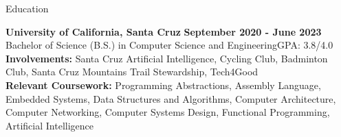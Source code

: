 \documentclass{resume}
\begin{document}
\begin{rSection}{\large Education}

{\bf University of California, Santa Cruz} \hfill {\bf{September 2020 - June 2023}}
\\ Bachelor of Science (B.S.) in Computer Science and Engineering\hfill {GPA: 3.8/4.0}
\\ \textbf{Involvements:}  Santa Cruz Artificial Intelligence, Cycling Club, Badminton Club, Santa Cruz Mountains Trail Stewardship, Tech4Good
\\ \textbf{Relevant Coursework:} Programming Abstractions, Assembly Language, Embedded Systems, Data Structures and Algorithms, Computer Architecture, Computer Networking, Computer Systems Design, Functional Programming, Artificial Intelligence

\end{rSection}
\end{document}

